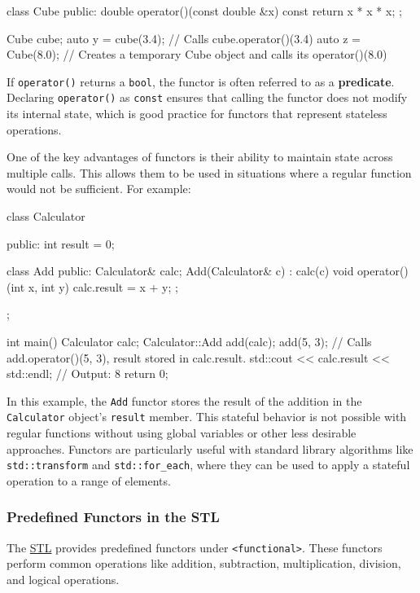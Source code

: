 \begin{codeblock}[language=C++]
class Cube {
public:
    double operator()(const double &x) const { return x * x * x; }
};

Cube cube;
auto y = cube(3.4); // Calls cube.operator()(3.4)
auto z = Cube{}(8.0); // Creates a temporary Cube object and calls its operator()(8.0)
\end{codeblock}

If \texttt{operator()} returns a \texttt{bool}, the functor is often referred to as a \textbf{predicate}. Declaring \texttt{operator()} as \texttt{const} ensures that calling the functor does not modify its internal state, which is good practice for functors that represent stateless operations.

One of the key advantages of functors is their ability to maintain state across multiple calls. This allows them to be used in situations where a regular function would not be sufficient. For example:

\begin{codeblock}[language=C++]
class Calculator {
public:
    int result = 0;

    class Add {
    public:
        Calculator& calc;
        Add(Calculator& c) : calc(c) {}
        void operator()(int x, int y) { calc.result = x + y; }
    };
};

int main() {
    Calculator calc;
    Calculator::Add add(calc);
    add(5, 3); // Calls add.operator()(5, 3), result stored in calc.result.
    std::cout << calc.result << std::endl; // Output: 8
    return 0;
}
\end{codeblock}

In this example, the \texttt{Add} functor stores the result of the addition in the \texttt{Calculator} object's \texttt{result} member. This stateful behavior is not possible with regular functions without using global variables or other less desirable approaches. Functors are particularly useful with standard library algorithms like \texttt{std::transform} and \texttt{std::for\_each}, where they can be used to apply a stateful operation to a range of elements.

\subsubsection{Predefined Functors in the STL}

The \hyperref[ch:stl]{STL} provides predefined functors under \texttt{<functional>}. These functors perform common operations like addition, subtraction, multiplication, division, and logical operations.

